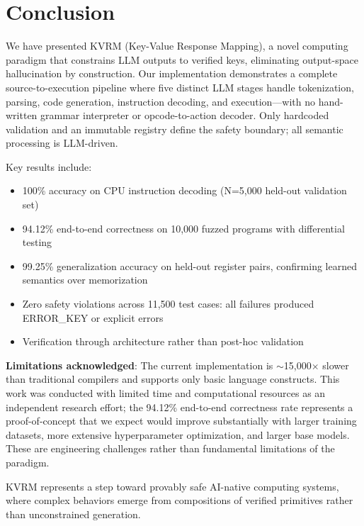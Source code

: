 \documentclass[11pt,a4paper]{article}
\begin{document}
\section{Conclusion}
\label{sec:conclusion}

We have presented KVRM (Key-Value Response Mapping), a novel computing paradigm that constrains LLM outputs to verified keys, eliminating output-space hallucination by construction. Our implementation demonstrates a complete source-to-execution pipeline where five distinct LLM stages handle tokenization, parsing, code generation, instruction decoding, and execution---with no hand-written grammar interpreter or opcode-to-action decoder. Only hardcoded validation and an immutable registry define the safety boundary; all semantic processing is LLM-driven.

Key results include:
\begin{itemize}
    \item 100\% accuracy on CPU instruction decoding (N=5,000 held-out validation set)
    \item 94.12\% end-to-end correctness on 10,000 fuzzed programs with differential testing
    \item 99.25\% generalization accuracy on held-out register pairs, confirming learned semantics over memorization
    \item Zero safety violations across 11,500 test cases: all failures produced ERROR\_KEY or explicit errors
    \item Verification through architecture rather than post-hoc validation
\end{itemize}

\textbf{Limitations acknowledged}: The current implementation is $\sim$15,000$\times$ slower than traditional compilers and supports only basic language constructs. This work was conducted with limited time and computational resources as an independent research effort; the 94.12\% end-to-end correctness rate represents a proof-of-concept that we expect would improve substantially with larger training datasets, more extensive hyperparameter optimization, and larger base models. These are engineering challenges rather than fundamental limitations of the paradigm.

KVRM represents a step toward provably safe AI-native computing systems, where complex behaviors emerge from compositions of verified primitives rather than unconstrained generation.
\end{document}
